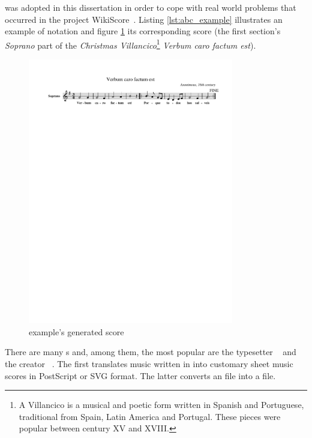 \abc{} was adopted in this dissertation in order to cope with real world problems that occurred in
the project WikiScore~\cite{almeida2012wiki}. Listing \ref{lst:abc_example} illustrates an example
of \abc{} notation and figure \ref{fig:abc_example} its corresponding score (the first
section's \emph{Soprano} part of the \emph{Christmas Villancico}\footnote{A Villancico is a musical
and poetic form written in Spanish and Portuguese, traditional from Spain, Latin America and
Portugal. These pieces were popular between century XV and XVIII.} \textit{Verbum caro factum est}).



\vspace{-0.25cm}
\begin{figure}[htb]
  \centering
  \includegraphics[width=0.8\textwidth, clip=true, trim = 0mm 230mm 0mm 17mm]{img/101.pdf}
  \caption{\abc{} example's generated score}
  \label{fig:abc_example}
\end{figure}

There are many \abcpt{}s and, among them, the most popular are the typesetter
\abcmtops{}~\cite{abcm2ps:Online} and the \midi{} creator \abctomidi{}~\cite{abc2midi:Online}. The
first translates music written in \abc{} into customary sheet music scores in PostScript or SVG
format. The latter converts an \abc{} file into a \midi{} file.

